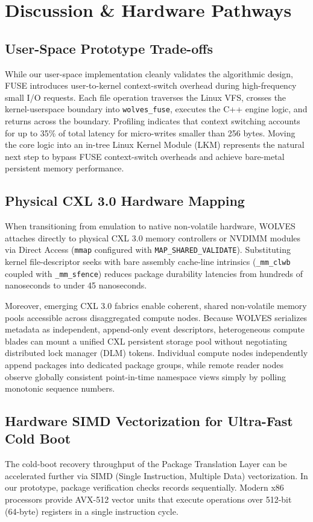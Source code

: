\documentclass[conference]{IEEEtran}
\begin{document}
\section{Discussion \& Hardware Pathways}

\subsection{User-Space Prototype Trade-offs}
While our user-space implementation cleanly validates the algorithmic design, FUSE introduces user-to-kernel context-switch overhead during high-frequency small I/O requests. Each file operation traverses the Linux VFS, crosses the kernel-userspace boundary into \texttt{wolves\_fuse}, executes the C++ engine logic, and returns across the boundary. Profiling indicates that context switching accounts for up to 35\% of total latency for micro-writes smaller than 256 bytes. Moving the core logic into an in-tree Linux Kernel Module (LKM) represents the natural next step to bypass FUSE context-switch overheads and achieve bare-metal persistent memory performance.

\subsection{Physical CXL 3.0 Hardware Mapping}
When transitioning from emulation to native non-volatile hardware, WOLVES attaches directly to physical CXL 3.0 memory controllers or NVDIMM modules via Direct Access (\texttt{mmap} configured with \texttt{MAP\_SHARED\_VALIDATE}). Substituting kernel file-descriptor seeks with bare assembly cache-line intrinsics (\texttt{\_mm\_clwb} coupled with \texttt{\_mm\_sfence}) reduces package durability latencies from hundreds of nanoseconds to under 45 nanoseconds.

Moreover, emerging CXL 3.0 fabrics enable coherent, shared non-volatile memory pools accessible across disaggregated compute nodes. Because WOLVES serializes metadata as independent, append-only event descriptors, heterogeneous compute blades can mount a unified CXL persistent storage pool without negotiating distributed lock manager (DLM) tokens. Individual compute nodes independently append packages into dedicated package groups, while remote reader nodes observe globally consistent point-in-time namespace views simply by polling monotonic sequence numbers.

\subsection{Hardware SIMD Vectorization for Ultra-Fast Cold Boot}
The cold-boot recovery throughput of the Package Translation Layer can be accelerated further via SIMD (Single Instruction, Multiple Data) vectorization. In our prototype, package verification checks records sequentially. Modern x86 processors provide AVX-512 vector units that execute operations over 512-bit (64-byte) registers in a single instruction cycle.
\end{document}
